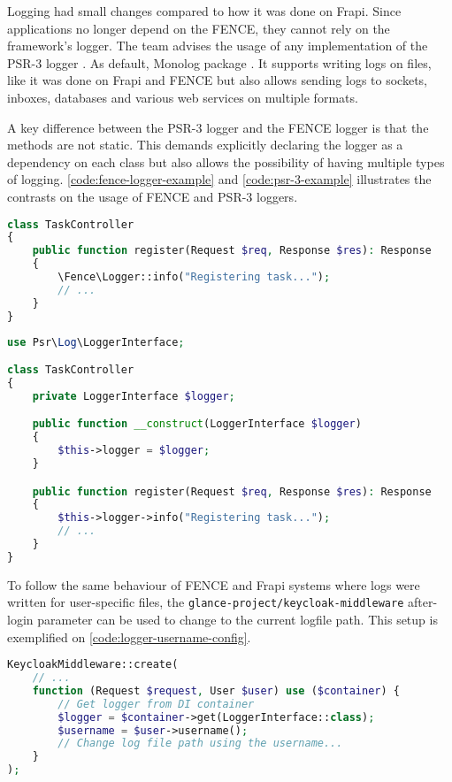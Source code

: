 Logging had small changes compared to how it was done on Frapi. Since applications no longer depend on the FENCE, they cannot rely on the framework's logger. The team advises the usage of any implementation of the PSR-3 logger \cite{psr-3}. As default, Monolog package \cite{monolog}. It supports writing logs on files, like it was done on Frapi and FENCE but also allows sending logs to sockets, inboxes, databases and various web services on multiple formats.

A key difference between the PSR-3 logger and the FENCE logger is that the methods are not static. This demands explicitly declaring the logger as a dependency on each class but also allows the possibility of having multiple types of logging. \autoref{code:fence-logger-example} and \autoref{code:psr-3-example} illustrates the contrasts on the usage of FENCE and PSR-3 loggers.

\begin{lstlisting}[language=PHP,label={code:fence-logger-example},caption={Usage example of the FENCE logger.}]
class TaskController
{
	public function register(Request $req, Response $res): Response
	{
		\Fence\Logger::info("Registering task...");
		// ...
	}
}
\end{lstlisting}

\begin{lstlisting}[language=PHP,label={code:psr-3-example},caption={Usage example of the PSR-3 logger.}]
use Psr\Log\LoggerInterface;

class TaskController
{
	private LoggerInterface $logger;

	public function __construct(LoggerInterface $logger)
	{
		$this->logger = $logger;
	}

	public function register(Request $req, Response $res): Response
	{
		$this->logger->info("Registering task...");
		// ...
	}
}
\end{lstlisting}

To follow the same behaviour of FENCE and Frapi systems where logs were written for user-specific files, the \texttt{glance-project/keycloak-middleware} after-login parameter can be used to change to the current logfile path. This setup is exemplified on \autoref{code:logger-username-config}.

\begin{lstlisting}[language=PHP,label={code:logger-username-config},caption={How to change the logfile based on the current user with the Keycloak middleware.}]
KeycloakMiddleware::create(
	// ...
	function (Request $request, User $user) use ($container) {
		// Get logger from DI container
		$logger = $container->get(LoggerInterface::class);
		$username = $user->username();
		// Change log file path using the username...
	}
);
\end{lstlisting}

